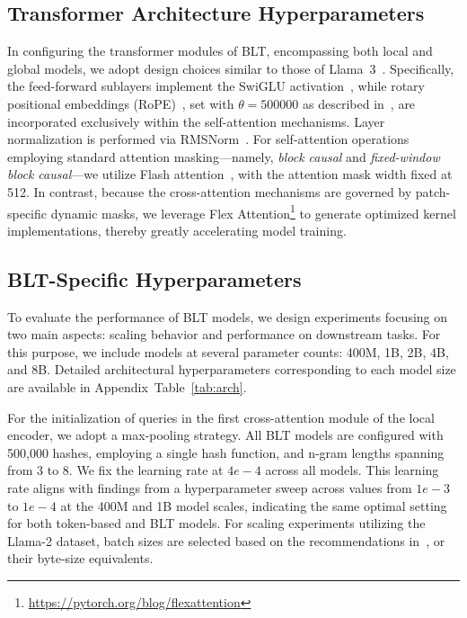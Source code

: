 \subsection{Transformer Architecture Hyperparameters} In configuring the transformer modules of {\textsc BLT}, encompassing both local and global models, we adopt design choices similar to those of Llama~3~\citep{dubey2024llama}. Specifically, the feed-forward sublayers implement the SwiGLU activation~\citep{swiglu}, while rotary positional embeddings (RoPE)~\citep{RoPe}, set with $\theta=500000$ as described in~\citep{xiong2024effective}, are incorporated exclusively within the self-attention mechanisms. Layer normalization is performed via RMSNorm~\citep{RMSNorm}. For self-attention operations employing standard attention masking—namely, \textit{block causal} and \textit{fixed-window block causal}—we utilize Flash attention~\citep{dao2022flashattention}, with the attention mask width fixed at 512. In contrast, because the cross-attention mechanisms are governed by patch-specific dynamic masks, we leverage Flex Attention\footnote{\url{https://pytorch.org/blog/flexattention}} to generate optimized kernel implementations, thereby greatly accelerating model training.

\subsection{{\textsc BLT}-Specific Hyperparameters} 

To evaluate the performance of {\textsc BLT} models, we design experiments focusing on two main aspects: scaling behavior and performance on downstream tasks. For this purpose, we include models at several parameter counts: 400M, 1B, 2B, 4B, and 8B. Detailed architectural hyperparameters corresponding to each model size are available in Appendix~Table~\ref{tab:arch}. 

For the initialization of queries in the first cross-attention module of the local encoder, we adopt a max-pooling strategy. All {\textsc BLT} models are configured with 500,000 hashes, employing a single hash function, and n-gram lengths spanning from 3 to 8. We fix the learning rate at $4e-4$ across all models. This learning rate aligns with findings from a hyperparameter sweep across values from $1e-3$ to $1e-4$ at the 400M and 1B model scales, indicating the same optimal setting for both token-based and {\textsc BLT} models. For scaling experiments utilizing the Llama-2 dataset, batch sizes are selected based on the recommendations in~\cite{dubey2024llama}, or their byte-size equivalents. 

